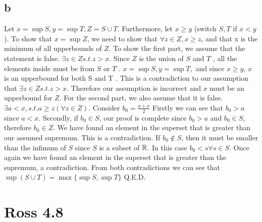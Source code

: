 \documentclass[12pt]{article}
\begin{document}
\subsection{b}
Let $x = \sup S, y = \sup T, Z = S \cup T $. Furthermore, let $x \geq y$ (switch $S, T$ if
$x < y$). To show that $x = \sup Z$, we need to show that $\forall z \in Z, x \geq z$, and
that x is the minimum of all upperbounds of $Z$.
\newline
To show the first part, we assume that the statement is false. $\exists z \in Z s.t. z >
x$. Since $Z$ is the union of $S$ and $T$ , all the elements inside must be from $S$
or $T$ . $x = \sup S, y = \sup T ,$ and since $x \geq y$, $x$ is an upperbound for both
S and T . This is a contradiction to our assumption that $\exists z \in Zs.t.z > x.$
Therefore our assumption is incorrect and $x$ must be an upperbound for $Z$.
\vspace{\baselineskip}
\newline
For the second part, we also assume that it is false. $\exists a < x, s.t.a \geq z(\forall z \in Z)$.
Consider $b_0 = \frac{a+x}{2}$
Firstly we can see that $b_0 > a$ since $a < x$.
Secondly,
if $b_0 \in S$, our proof is complete since $b_0 > a$ and $b_0 \in S$, therefore $b_0 \in Z$.
We have found an element in the superset that is greater than our assumed
supremum. This is a contradiction.
\newline
If $b_0 \notin S$, then it must be smaller than the infimum of $S$ since $S$ is a subset of $\mathbb{R}$. In this case $b_0 < s \forall s \in S$. Once again we have found an element in the superset that is greater than the supremum, a contradiction.
\newline
From both contradictions we can see that $\sup (S \cup T) = \max \{\sup S, \sup T\}$
\newline
Q.E.D.
\newpage


























\section{Ross 4.8}
\end{document}
